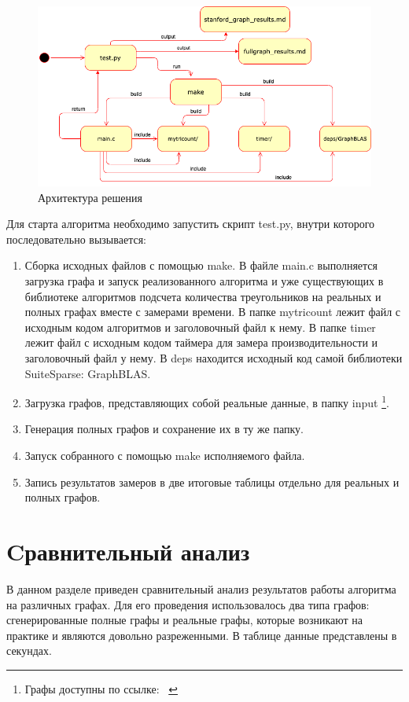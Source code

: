 \documentclass[14pt]{matmex-diploma}
\begin{document}
\begin{figure}[h!]
	\centering
	\includegraphics[width=\columnwidth]{pics/arch1.png}
	\caption{Архитектура решения}
	\label{fig:Архитектура}
\end{figure}
Для старта алгоритма необходимо запустить скрипт test.py,  внутри которого последовательно вызывается:
    \begin{enumerate}
        \item Сборка исходных файлов с помощью make.
        \subitem В файле main.c выполняется загрузка графа и запуск реализованного алгоритма и уже существующих в библиотеке алгоритмов подсчета количества треугольников на реальных и полных графах вместе с замерами времени.
        \subitem В папке mytricount лежит файл с исходным кодом алгоритмов и заголовочный файл к нему.
        \subitem В папке timer лежит файл с исходным кодом таймера для замера производительности и заголовочный файл у нему.
        \subitem В deps находится исходный код самой библиотеки SuiteSparse: GraphBLAS. 
        \item Загрузка графов, представляющих собой реальные данные, в папку input \footnote{Графы доступны по ссылке: ~\cite{data} }.
        \item Генерация полных графов и сохранение их в ту же папку.
        \item Запуск собранного с помощью make исполняемого файла.
        \item Запись результатов замеров в две итоговые таблицы отдельно для реальных и полных графов.
    \end{enumerate}
    

\section{Cравнительный анализ}
В данном разделе приведен сравнительный анализ результатов работы алгоритма на различных графах. Для его проведения использовалось два типа графов: сгенерированные полные графы и реальные графы, которые возникают на практике и являются довольно разреженными. В таблице данные представлены в секундах.
 
\end{document}
